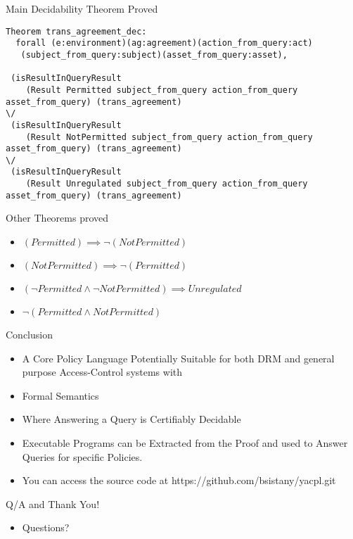\documentclass{beamer}
\begin{document}
\begin{frame}[fragile]{Main Decidability Theorem Proved}

\lstset{language=Coq}
\begin{lstlisting}
Theorem trans_agreement_dec:
  forall (e:environment)(ag:agreement)(action_from_query:act)
   (subject_from_query:subject)(asset_from_query:asset),
   
 (isResultInQueryResult
    (Result Permitted subject_from_query action_from_query asset_from_query) (trans_agreement)
\/
 (isResultInQueryResult
    (Result NotPermitted subject_from_query action_from_query asset_from_query) (trans_agreement)
\/
 (isResultInQueryResult
    (Result Unregulated subject_from_query action_from_query asset_from_query) (trans_agreement)
\end{lstlisting}
\end{frame}
\begin{frame}[fragile]{Other Theorems proved}
\Large
\begin{itemize}
\item $(Permitted) \implies  \neg (NotPermitted) $
\item $(NotPermitted) \implies  \neg (Permitted) $
\item $(\neg Permitted \land \neg NotPermitted) \implies Unregulated$
\item $\neg (Permitted \land NotPermitted)$
\end{itemize}
\end{frame}

\begin{frame}[fragile]{Conclusion}
\Large
\begin{itemize}
\item A Core Policy Language Potentially Suitable for both DRM and general purpose Access-Control systems with 
\item Formal Semantics 
\item Where Answering a Query is Certifiably Decidable
\item Executable Programs can be Extracted from the Proof and used to Answer Queries for specific Policies.
\item You can access the source code at https://github.com/bsistany/yacpl.git
\end{itemize}
\end{frame}


\begin{frame}[fragile]{Q/A and Thank You!}
\Large
\begin{itemize}
\item Questions?
\end{itemize}
\end{frame}
\end{document}
